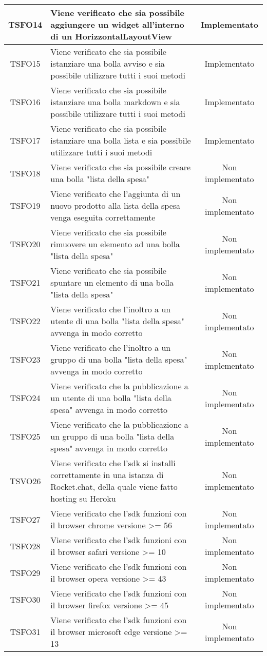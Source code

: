 \begin{center}
\begin{longtable}{|c|>{\centering}m{10cm}|c|}
		TSFO14 & Viene verificato che sia possibile aggiungere un widget all'interno di un HorizzontalLayoutView & Implementato \\ \hline
		TSFO15 & Viene verificato che sia possibile istanziare una bolla avviso e sia possibile utilizzare tutti i suoi metodi & Implementato \\ \hline
		TSFO16 & Viene verificato che sia possibile istanziare una bolla markdown e sia possibile utilizzare tutti i suoi metodi & Implementato \\ \hline
		TSFO17 & Viene verificato che sia possibile istanziare una bolla lista e sia possibile utilizzare tutti i suoi metodi & Implementato \\ \hline
		TSFO18 & Viene verificato che sia possibile creare una bolla "lista della spesa" & Non implementato \\ \hline
		TSFO19 & Viene verificato che l'aggiunta di un nuovo prodotto alla lista della spesa venga eseguita correttamente & Non implementato \\ \hline
		TSFO20 & Viene verificato che sia possibile rimuovere un elemento ad una bolla "lista della spesa" & Non implementato \\ \hline
		TSFO21 & Viene verificato che sia possibile spuntare un elemento di una bolla "lista della spesa" & Non implementato \\ \hline
		TSFO22 & Viene verificato che l'inoltro a un utente di una bolla "lista della spesa" avvenga in modo corretto & Non implementato \\ \hline
		TSFO23 & Viene verificato che l'inoltro a un gruppo di una bolla "lista della spesa" avvenga in modo corretto & Non implementato \\ \hline
		TSFO24 & Viene verificato che la pubblicazione a un utente di una bolla "lista della spesa" avvenga in modo corretto & Non implementato \\ \hline
		TSFO25 & Viene verificato che la pubblicazione a un gruppo di una bolla "lista della spesa" avvenga in modo corretto & Non implementato \\ \hline
		TSVO26 & Viene verificato che l'sdk si installi correttamente in una istanza di Rocket.chat, della quale viene fatto hosting su Heroku & Non implementato \\ \hline
		TSFO27 & Viene verificato che l'sdk funzioni con il browser chrome versione >= 56 & Non implementato \\ \hline
		TSFO28 & Viene verificato che l'sdk funzioni con il browser safari versione >= 10 & Non implementato \\ \hline
		TSFO29 & Viene verificato che l'sdk funzioni con il browser opera versione >= 43 & Non implementato \\ \hline
		TSFO30 & Viene verificato che l'sdk funzioni con il browser firefox versione >= 45 & Non implementato \\ \hline
		TSFO31 & Viene verificato che l'sdk funzioni con il browser microsoft edge versione >= 13 & Non implementato \\ \hline
	\end{longtable}
\end{center}
